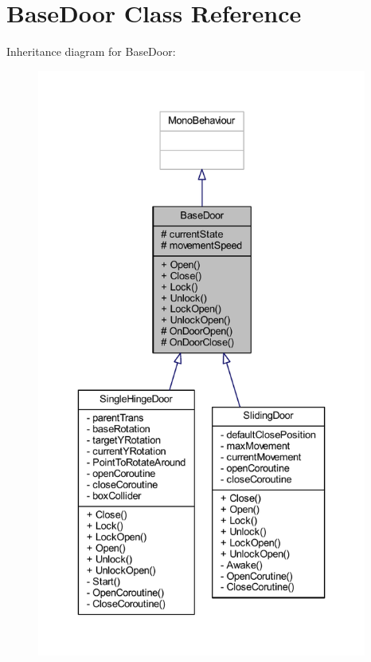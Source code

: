 \hypertarget{class_base_door}{}\section{Base\+Door Class Reference}
\label{class_base_door}


Inheritance diagram for Base\+Door\+:\nopagebreak
\begin{figure}[H]
\begin{center}
\leavevmode
\includegraphics[height=550pt]{class_base_door__inherit__graph}
\end{center}
\end{figure}


